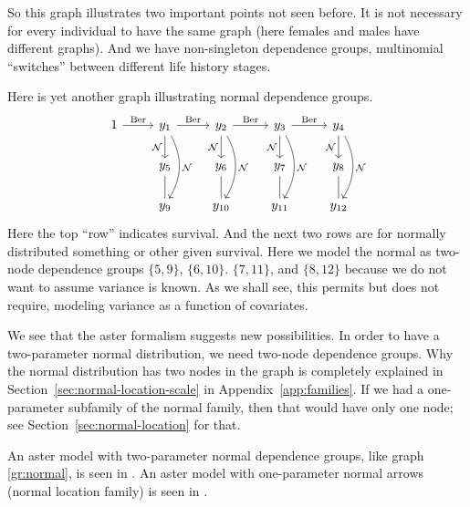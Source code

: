 So this graph illustrates two important points not seen before.
It is not necessary for every individual to
have the same graph (here females and males have different graphs).
And we have non-singleton dependence groups,
multinomial ``switches'' between different life history stages.

Here is yet another graph illustrating normal dependence groups.
\begin{equation} \label{gr:normal}
\begin{tikzcd}
   1
   \arrow{r}{\text{Ber}}
   & y_1
   \arrow{d}[swap]{\mathcal{N}}
   \arrow[bend left]{dd}{\mathcal{N}}
   \arrow{r}{\text{Ber}}
   & y_2
   \arrow{d}[swap]{\mathcal{N}}
   \arrow[bend left]{dd}{\mathcal{N}}
   \arrow{r}{\text{Ber}}
   & y_3
   \arrow{d}[swap]{\mathcal{N}}
   \arrow[bend left]{dd}{\mathcal{N}}
   \arrow{r}{\text{Ber}}
   & y_4
   \arrow{d}[swap]{\mathcal{N}}
   \arrow[bend left]{dd}{\mathcal{N}}
   \\
   \hphantom{1}
   & y_5 \arrow[dash]{d}
   & y_6 \arrow[dash]{d}
   & y_7 \arrow[dash]{d}
   & y_8 \arrow[dash]{d}
   \\
   \hphantom{1} & y_9 & y_{10} & y_{11} & y_{12}
\end{tikzcd}
\end{equation}
Here the top ``row'' indicates survival.  And the next two rows are
for normally distributed something or other given survival.  Here we
model the normal as two-node dependence groups
$\{ 5, 9 \}$,
$\{ 6, 10 \}$.
$\{ 7, 11 \}$, and
$\{ 8, 12 \}$ because
we do not want to assume variance is known.  As we shall see, this permits
but does not require, modeling variance as a function of covariates.

We see that the aster formalism suggests new possibilities.  In order to
have a two-parameter normal distribution, we need two-node dependence groups.
Why the normal distribution has two nodes in the graph is completely
explained in Section~\ref{sec:normal-location-scale}
in Appendix~\ref{app:families}.  If we had a one-parameter subfamily
of the normal family, then that would have only one node; see
Section~\ref{sec:normal-location} for that.

An aster model with two-parameter normal dependence groups,
like graph \eqref{gr:normal}, is seen in \citet{aster-microbial-symbionts}.
An aster model with one-parameter normal arrows (normal location family)
is seen in \citet{warwell-shaw}.

